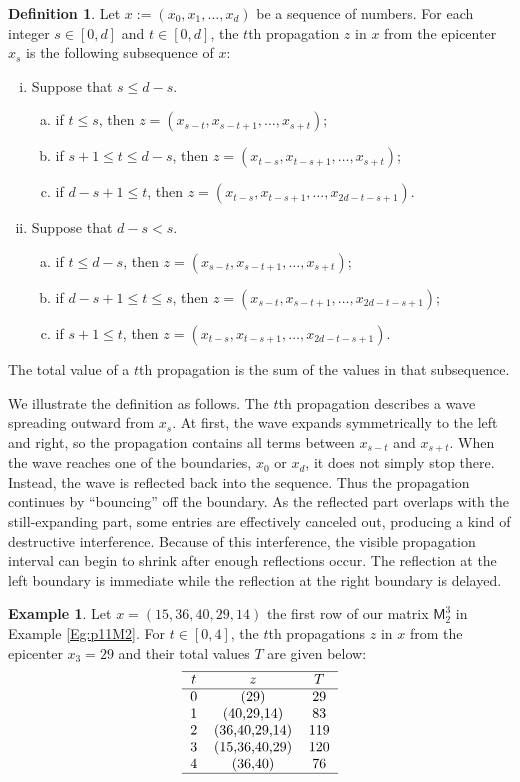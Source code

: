 \documentclass[12pt,reqno]{amsart}
\renewcommand{\leq}{\leqslant}
\newcommand{\M}{\mathsf{M}}
\theoremstyle{definition}
\newtheorem{defn}[thm]{Definition}
\newtheorem{eg}[thm]{Example}
\numberwithin{equation}{section}
\begin{document}
\begin{defn}\label{def: propagation} Let $x:=(x_0,x_1,\ldots,x_d)$ be a sequence of numbers. For each integer $s\in [0,d]$ and $t\in [0,d]$, the $t$th propagation $z$ in $x$ from the epicenter $x_s$ is the following subsequence of $x$:
	\begin{enumerate}[(i)]
		\item Suppose that $s\leq d-s$.
		\begin{enumerate}[(a)]
			\item if $t\leq s$, then $z=(x_{s-t},x_{s-t+1},\ldots,x_{s+t})$;
			\item if $s+1\leq t\leq d-s$, then $z=(x_{t-s},x_{t-s+1},\ldots,x_{s+t})$;
			\item if $d-s+1\leq t$, then $z=(x_{t-s},x_{t-s+1},\ldots,x_{2d-t-s+1})$.
		\end{enumerate}
		\item Suppose that $d-s< s$.
		\begin{enumerate}[(a)]
			\item if $t\leq d-s$, then $z=(x_{s-t},x_{s-t+1},\ldots,x_{s+t})$;
			\item if $d-s+1\leq t\leq s$, then $z=(x_{s-t},x_{s-t+1},\ldots,x_{2d-t-s+1})$;
			\item if $s+1\leq t$, then $z=(x_{t-s},x_{t-s+1},\ldots,x_{2d-t-s+1})$.
		\end{enumerate}
	\end{enumerate} The total value of a $t$th propagation is the sum of the values in that subsequence. 
\end{defn}

We illustrate the definition as follows. The $t$th propagation describes a wave spreading outward from $x_s$. At first, the wave expands symmetrically to the left and right, so the propagation contains all terms between $x_{s-t}$ and $x_{s+t}$. When the wave reaches one of the boundaries, $x_0$ or $x_d$, it does not simply stop there. Instead, the wave is reflected back into the sequence. Thus the propagation continues by “bouncing” off the boundary. As the reflected part overlaps with the still-expanding part, some entries are effectively canceled out, producing a kind of destructive interference. Because of this interference, the visible propagation interval can begin to shrink after enough reflections occur. The reflection at the left boundary is immediate while the reflection at the right boundary is delayed.

\begin{eg}\label{Eg:p11Prop} Let $x=(15,36,40,29,14)$ the first row of our matrix $\M_2^3$ in Example \ref{Eg:p11M2}. For $t\in [0,4]$, the $t$th propagations $z$ in $x$ from the epicenter $x_3=29$ and their total values $T$ are given below:
\[\begin{tabular}{ccc}
  \hline 
  $t$&$z$&$T$\\
  \hline 
  0&(29)&29\\
  1&(40,29,14)&83\\
  2&(36,40,29,14)&119\\
  3&(15,36,40,29)&120\\
  4&(36,40) &76\\
  \hline
\end{tabular}\]
\end{eg}
\end{document}
